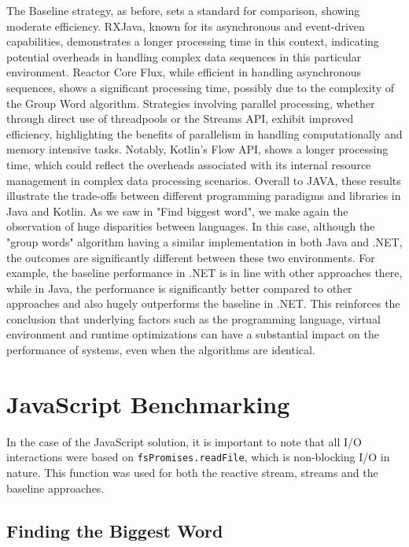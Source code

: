     The Baseline strategy, as before, sets a standard for comparison, showing moderate efficiency. RXJava, known for its asynchronous and event-driven capabilities, demonstrates a longer processing time in this context, indicating potential overheads in handling complex data sequences in this particular environment. Reactor Core Flux, while efficient in handling asynchronous sequences, shows a significant processing time, possibly due to the complexity of the Group Word algorithm. Strategies involving parallel processing, whether through direct use of threadpools or the Streams API, exhibit improved efficiency, highlighting the benefits of parallelism in handling computationally and memory intensive tasks. Notably, Kotlin's Flow API, shows a longer processing time, which could reflect the overheads associated with its internal resource management in complex data processing scenarios.
    Overall to JAVA, these results illustrate the trade-offs between different programming paradigms and libraries in Java and Kotlin. 
    As we saw in "Find biggest word", we make again the observation of huge disparities between languages. In this case, although the "group words" algorithm having a similar implementation in both Java and .NET, the outcomes are significantly different between these two environments. For example, the baseline performance in .NET is in line with other approaches there, while in Java, the performance is significantly better compared to other approaches and also hugely outperforms the baseline in .NET.
    This reinforces the conclusion that underlying factors such as the programming language, virtual environment and runtime optimizations can have a substantial impact on the performance of systems, even when the algorithms are identical.

\section{JavaScript Benchmarking}
\label{sec:js_implementation}

In the case of the JavaScript solution, it is important to note that all I/O interactions were based on \texttt{fsPromises.readFile}, which is non-blocking I/O in nature. This function was used for both the reactive stream, streams and the baseline approaches.

\subsection{Finding the Biggest Word}
\label{subsec:biggest_word_js}


